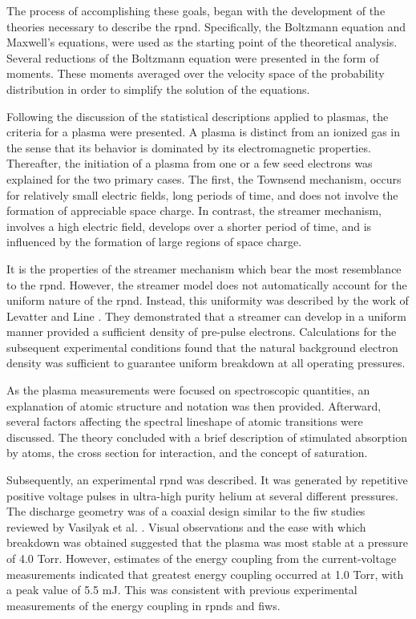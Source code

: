 The process of accomplishing these goals, began with the development of the
theories necessary to describe the \acs{rpnd}. Specifically, the Boltzmann
equation and Maxwell's equations, were used as the starting point of the
theoretical analysis. Several reductions of the Boltzmann equation were
presented in the form of moments. These moments averaged over the velocity space
of the probability distribution in order to simplify the solution of the
equations.

Following the discussion of the statistical descriptions applied to plasmas, the
criteria for a plasma were presented. A plasma is distinct from an ionized gas
in the sense that its behavior is dominated by its electromagnetic properties.
Thereafter, the initiation of a plasma from one or a few seed electrons was
explained for the two primary cases. The first, the Townsend mechanism, occurs
for relatively small electric fields, long periods of time, and does not involve
the formation of appreciable space charge. In contrast, the streamer mechanism,
involves a high electric field, develops over a shorter period of time, and is
influenced by the formation of large regions of space charge.

It is the properties of the streamer mechanism which bear the most resemblance
to the \acs{rpnd}. However, the streamer model does not automatically account
for the uniform nature of the \acs{rpnd}. Instead, this uniformity was described
by the work of Levatter and Line \cite{Levatter1980}. They demonstrated that a
streamer can develop in a uniform manner provided a sufficient density of
pre-pulse electrons. Calculations for the subsequent experimental conditions
found that the natural background electron density was sufficient to guarantee
uniform breakdown at all operating pressures.

As the plasma measurements were focused on spectroscopic quantities, an
explanation of atomic structure and notation was then provided. Afterward,
several factors affecting the spectral lineshape of atomic transitions were
discussed. The theory concluded with a brief description of stimulated
absorption by atoms, the cross section for interaction, and the concept of
saturation.

Subsequently, an experimental \acs{rpnd} was described. It was generated by
repetitive positive voltage pulses in ultra-high purity helium at several
different pressures. The discharge geometry was of a coaxial design similar to
the \acs{fiw} studies reviewed by Vasilyak et al. \cite{Vasilyak1994}. Visual
observations and the ease with which breakdown was obtained suggested that the
plasma was most stable at a pressure of 4.0 Torr. However, estimates of the
energy coupling from the current-voltage measurements indicated that greatest
energy coupling occurred at 1.0 Torr, with a peak value of 5.5 mJ. This was
consistent with previous experimental measurements of the energy coupling in
\acs{rpnd}s and \acs{fiw}s.

